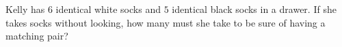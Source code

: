 Kelly has $6$ identical white socks and $5$ identical black socks in a drawer. If she takes socks without looking, how many must she take to be sure of having a matching pair?
